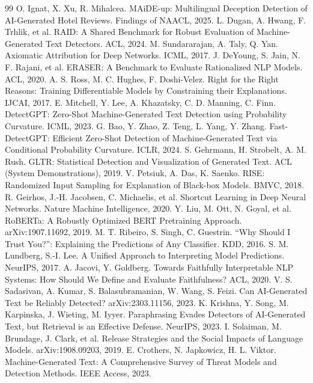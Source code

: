 \documentclass[10pt,twocolumn]{article}
\begin{document}
\begin{thebibliography}{99}\small
{} O. Ignat, X. Xu, R. Mihalcea. MAiDE-up: Multilingual Deception Detection of AI-Generated Hotel Reviews. Findings of NAACL, 2025.
 L. Dugan, A. Hwang, F. Trhlik, et al. RAID: A Shared Benchmark for Robust Evaluation of Machine-Generated Text Detectors. ACL, 2024.
 M. Sundararajan, A. Taly, Q. Yan. Axiomatic Attribution for Deep Networks. ICML, 2017.
 J. DeYoung, S. Jain, N. F. Rajani, et al. ERASER: A Benchmark to Evaluate Rationalized NLP Models. ACL, 2020.
 A. S. Ross, M. C. Hughes, F. Doshi-Velez. Right for the Right Reasons: Training Differentiable Models by Constraining their Explanations. IJCAI, 2017.
 E. Mitchell, Y. Lee, A. Khazatsky, C. D. Manning, C. Finn. DetectGPT: Zero-Shot Machine-Generated Text Detection using Probability Curvature. ICML, 2023.
 G. Bao, Y. Zhao, Z. Teng, L. Yang, Y. Zhang. Fast-DetectGPT: Efficient Zero-Shot Detection of Machine-Generated Text via Conditional Probability Curvature. ICLR, 2024.
 S. Gehrmann, H. Strobelt, A. M. Rush. GLTR: Statistical Detection and Visualization of Generated Text. ACL (System Demonstrations), 2019.
 V. Petsiuk, A. Das, K. Saenko. RISE: Randomized Input Sampling for Explanation of Black-box Models. BMVC, 2018.
 R. Geirhos, J.-H. Jacobsen, C. Michaelis, et al. Shortcut Learning in Deep Neural Networks. Nature Machine Intelligence, 2020.
 Y. Liu, M. Ott, N. Goyal, et al. RoBERTa: A Robustly Optimized BERT Pretraining Approach. arXiv:1907.11692, 2019.
 M. T. Ribeiro, S. Singh, C. Guestrin. ``Why Should I Trust You?'': Explaining the Predictions of Any Classifier. KDD, 2016.
 S. M. Lundberg, S.-I. Lee. A Unified Approach to Interpreting Model Predictions. NeurIPS, 2017.
 A. Jacovi, Y. Goldberg. Towards Faithfully Interpretable NLP Systems: How Should We Define and Evaluate Faithfulness? ACL, 2020.
 V. S. Sadasivan, A. Kumar, S. Balasubramanian, W. Wang, S. Feizi. Can AI-Generated Text be Reliably Detected? arXiv:2303.11156, 2023.
 K. Krishna, Y. Song, M. Karpinska, J. Wieting, M. Iyyer. Paraphrasing Evades Detectors of AI-Generated Text, but Retrieval is an Effective Defense. NeurIPS, 2023.
 I. Solaiman, M. Brundage, J. Clark, et al. Release Strategies and the Social Impacts of Language Models. arXiv:1908.09203, 2019.
 E. Crothers, N. Japkowicz, H. L. Viktor. Machine-Generated Text: A Comprehensive Survey of Threat Models and Detection Methods. IEEE Access, 2023.

\end{thebibliography}
\end{document}
